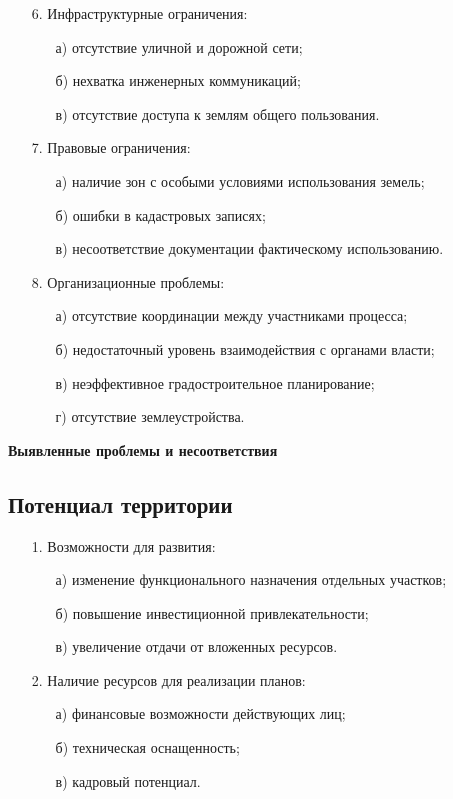 \begin{enumerate}
\begin{enumerate}
    \end{enumerate}
    \item[6.] Инфраструктурные ограничения:
    \begin{enumerate}
        \item[а)] отсутствие уличной и дорожной сети;
        \item[б)] нехватка инженерных коммуникаций;
        \item[в)] отсутствие доступа к землям общего пользования.
    \end{enumerate}
    \item[7.] Правовые ограничения:
    \begin{enumerate}
        \item[а)] наличие зон с особыми условиями использования земель;
        \item[б)] ошибки в кадастровых записях;
        \item[в)] несоответствие документации фактическому использованию.
    \end{enumerate}
    \item[8.] Организационные проблемы:
    \begin{enumerate}
        \item[а)] отсутствие координации между участниками процесса;
        \item[б)] недостаточный уровень взаимодействия с органами власти;
        \item[в)] неэффективное градостроительное планирование;
        \item[г)] отсутствие землеустройства.
    \end{enumerate}
\end{enumerate}

\textbf{Выявленные проблемы и несоответствия}

\subsection{Потенциал территории}
\label{subsec:potenc}

\begin{enumerate}
    \item[1.] Возможности для развития:
    \begin{enumerate}
        \item[а)] изменение функционального назначения отдельных участков;
        \item[б)] повышение инвестиционной привлекательности; 
        \item[в)] увеличение отдачи от вложенных ресурсов.
    \end{enumerate}
    \item[2.] Наличие ресурсов для реализации планов:
    \begin{enumerate}
        \item[а)] финансовые возможности действующих лиц;
        \item[б)] техническая оснащенность;
        \item[в)] кадровый потенциал.
    \end{enumerate}
\end{enumerate}

